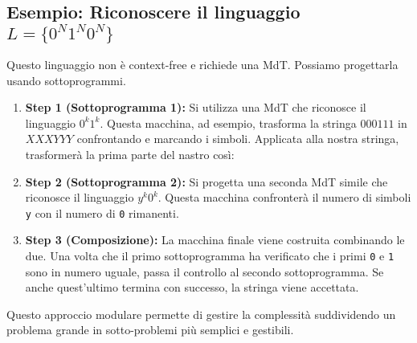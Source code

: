 \documentclass[a4paper]{article}
\theoremstyle{definition} %
\begin{document}
\subsection{Esempio: Riconoscere il linguaggio $L = \{0^N1^N0^N\}$}
Questo linguaggio non è context-free e richiede una MdT. Possiamo progettarla usando sottoprogrammi.
\begin{enumerate}
    \item \textbf{Step 1 (Sottoprogramma 1):} Si utilizza una MdT che riconosce il linguaggio $0^k1^k$. Questa macchina, ad esempio, trasforma la stringa $000111$ in $XXX YYY$ confrontando e marcando i simboli. Applicata alla nostra stringa, trasformerà la prima parte del nastro così:
    \begin{center}
    \end{center}
    \item \textbf{Step 2 (Sottoprogramma 2):} Si progetta una seconda MdT simile che riconosce il linguaggio $y^k0^k$. Questa macchina confronterà il numero di simboli \texttt{y} con il numero di \texttt{0} rimanenti.
    \item \textbf{Step 3 (Composizione):} La macchina finale viene costruita combinando le due. Una volta che il primo sottoprogramma ha verificato che i primi \texttt{0} e \texttt{1} sono in numero uguale, passa il controllo al secondo sottoprogramma. Se anche quest'ultimo termina con successo, la stringa viene accettata.
\end{enumerate}
Questo approccio modulare permette di gestire la complessità suddividendo un problema grande in sotto-problemi più semplici e gestibili.
\end{document}
